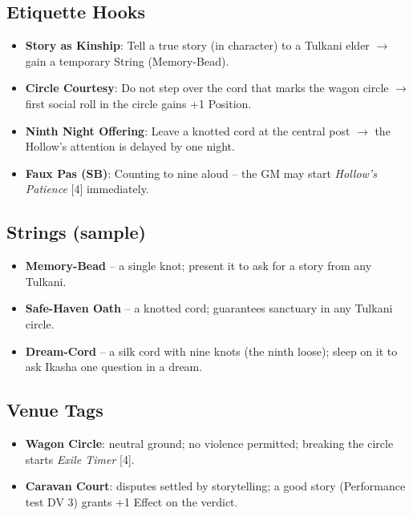 \documentclass[12pt,oneside]{book}
\begin{document}
\subsection*{Etiquette Hooks}
\begin{itemize}
  \item \textbf{Story as Kinship}: Tell a true story (in character) to a Tulkani elder $\rightarrow$ gain a temporary String (Memory-Bead).
  \item \textbf{Circle Courtesy}: Do not step over the cord that marks the wagon circle $\rightarrow$ first social roll in the circle gains +1 Position.
  \item \textbf{Ninth Night Offering}: Leave a knotted cord at the central post $\rightarrow$ the Hollow's attention is delayed by one night.
  \item \textbf{Faux Pas (SB)}: Counting to nine aloud -- the GM may start \textit{Hollow's Patience} [4] immediately.
\end{itemize}

\subsection*{Strings (sample)}
\begin{itemize}
  \item \textbf{Memory-Bead} -- a single knot; present it to ask for a story from any Tulkani.
  \item \textbf{Safe-Haven Oath} -- a knotted cord; guarantees sanctuary in any Tulkani circle.
  \item \textbf{Dream-Cord} -- a silk cord with nine knots (the ninth loose); sleep on it to ask Ikasha one question in a dream.
\end{itemize}

\subsection*{Venue Tags}
\begin{itemize}
  \item \textbf{Wagon Circle}: neutral ground; no violence permitted; breaking the circle starts \textit{Exile Timer } [4].
  \item \textbf{Caravan Court}: disputes settled by storytelling; a good story (Performance test DV 3) grants +1 Effect on the verdict.
\end{itemize}

\newpage

\newpage
\end{document}
